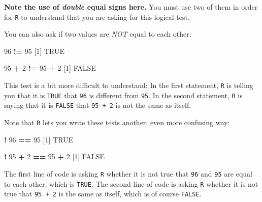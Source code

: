 \documentclass[]{book}
\newenvironment{Shaded}{\begin{snugshade}}{\end{snugshade}}
\newcommand{\DecValTok}[1]{\textcolor[rgb]{0.00,0.00,0.81}{#1}}
\newcommand{\NormalTok}[1]{#1}
\newcommand{\OperatorTok}[1]{\textcolor[rgb]{0.81,0.36,0.00}{\textbf{#1}}}
\newcommand{\OtherTok}[1]{\textcolor[rgb]{0.56,0.35,0.01}{#1}}
\newcommand{\StringTok}[1]{\textcolor[rgb]{0.31,0.60,0.02}{#1}}
\begin{document}
\textbf{Note the use of \emph{double} equal signs here.} You must use two of them in order for \texttt{R} to understand that you are asking for this logical test.

You can also ask if two values are \emph{NOT} equal to each other:

\begin{Shaded}
\begin{Highlighting}[]
\DecValTok{96} \OperatorTok{!=}\StringTok{ }\DecValTok{95}
\NormalTok{[}\DecValTok{1}\NormalTok{] }\OtherTok{TRUE}
\end{Highlighting}
\end{Shaded}

\begin{Shaded}
\begin{Highlighting}[]
\DecValTok{95} \OperatorTok{+}\StringTok{ }\DecValTok{2} \OperatorTok{!=}\StringTok{ }\DecValTok{95} \OperatorTok{+}\StringTok{ }\DecValTok{2}
\NormalTok{[}\DecValTok{1}\NormalTok{] }\OtherTok{FALSE}
\end{Highlighting}
\end{Shaded}

This test is a bit more difficult to understand: In the first statement, \texttt{R} is telling you that it is \texttt{TRUE} that \texttt{96} is different from \texttt{95}. In the second statement, \texttt{R} is saying that it is \texttt{FALSE} that \texttt{95\ +\ 2} is not the same as itself.

Note that \texttt{R} lets you write these tests another, even more confusing way:

\begin{Shaded}
\begin{Highlighting}[]
\OperatorTok{!}\StringTok{ }\DecValTok{96} \OperatorTok{==}\StringTok{ }\DecValTok{95}
\NormalTok{[}\DecValTok{1}\NormalTok{] }\OtherTok{TRUE}
\end{Highlighting}
\end{Shaded}

\begin{Shaded}
\begin{Highlighting}[]
\OperatorTok{!}\StringTok{ }\DecValTok{95} \OperatorTok{+}\StringTok{ }\DecValTok{2} \OperatorTok{==}\StringTok{ }\DecValTok{95} \OperatorTok{+}\StringTok{ }\DecValTok{2}
\NormalTok{[}\DecValTok{1}\NormalTok{] }\OtherTok{FALSE}
\end{Highlighting}
\end{Shaded}

The first line of code is asking \texttt{R} whether it is not true that \texttt{96} and \texttt{95} are equal to each other, which is \texttt{TRUE}. The second line of code is asking \texttt{R} whether it is not true that \texttt{95\ +\ 2} is the same as itself, which is of course \texttt{FALSE}.
\end{document}
